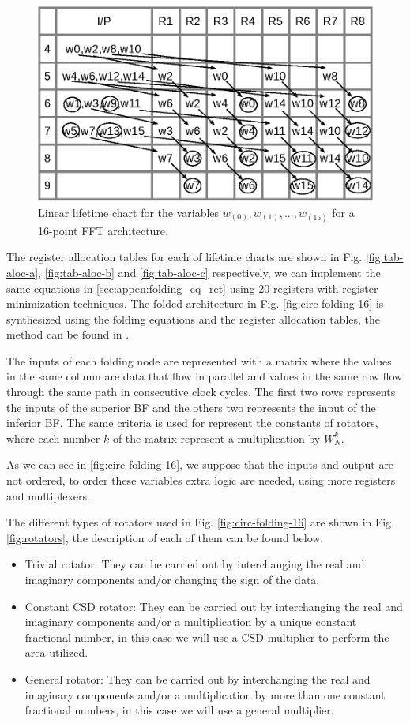 \documentclass[journal,comsoc]{IEEEtran}
\begin{document}
\begin{figure}[htbp]%
\centering
 \includegraphics[width=0.8\linewidth]{Diagramas/tab_life_c.eps}%
\caption{Linear lifetime chart for the variables $w_{(0)}, w_{(1)},...,w_{(15)}$ for a 16-point FFT architecture.}
\label{fig:tab-life-c}
\end{figure}

The register allocation tables for each of lifetime charts are shown in Fig. \ref{fig:tab-aloc-a}, \ref{fig:tab-aloc-b} and \ref{fig:tab-aloc-c} respectively, we can implement the same equations in \ref{sec:appen:folding_eq_ret} using 20 registers with register minimization techniques. The folded architecture in Fig. \ref{fig:circ-folding-16} is synthesized using the folding equations and the register allocation tables, the method can be found in \cite{pipeline_parhi_book}. 

The inputs of each folding node are represented with a matrix where the values in the same column are data that flow in parallel and values in the same row
flow through the same path in consecutive clock cycles. The first two rows represents the inputs of the superior BF and the others two represents the input of the inferior BF. 
The same criteria is used for represent the constants of rotators, where each number $k$ of the matrix represent a multiplication by $W^k_N$.

As we can see in \ref{fig:circ-folding-16}, we suppose that the inputs and output are not ordered, to order these variables extra logic are needed, using more registers and multiplexers.

The different types of rotators used in Fig. \ref{fig:circ-folding-16} are shown in Fig. \ref{fig:rotators}, the description of each of them can be found below.

\begin{itemize}

\item Trivial rotator: They can be carried out by interchanging the real and imaginary components and/or changing the sign of the data.
\item Constant CSD rotator: They can be carried out by interchanging the real and imaginary components and/or a multiplication by a unique constant fractional number, in this case we will use a CSD multiplier to perform the area utilized.
\item General rotator: They can be carried out by interchanging the real and imaginary components and/or a multiplication by more than one constant fractional numbers, in this case we will use a general multiplier.

\end{itemize}
\end{document}
